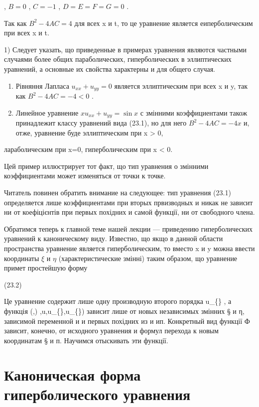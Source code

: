 \documentclass[
  ukrainian,
]{article}
\begin{document}
, \(B=0\) , \(C=-1\) , \(D=E=F=G=0\) .

Так как \(B^2 - 4AC = 4\) для всех x и t, то це уравнение является
еиперболическим при всех x и t.

1) Следует указать, що приведенные в примерах уравнения являются
частными случаями более общих параболических, гиперболических в
эллиптических уравнений, а основные их свойства характерны и для общего
случая.

\begin{enumerate}
\def\labelenumi{\arabic{enumi}.}
\setcounter{enumi}{2}
\item
  Рівняння Лапласа \(u_{xx} + u_{yy} = 0\) является эллиптическим при
  всех x и y, так как \(B^2 - 4AC = - 4 < 0\) .
\item
  Линейное уравнение \(xu_{xx} + u_{yy} = \sin x\) с змінними
  коэффициентами також принадлежит классу уравнений вида (23.1), но для
  него \(B^2-4AC=-4x\) и, отже, уравнение буде эллиптическим при x
  \textgreater{} 0,
\end{enumerate}

лараболическим при x=0, гиперболическим при x \textless{} 0.

Цей пример иллюстрирует тот факт, що тип уравнения о змінними
коэффициентами может изменяться от точки к точке.

Читатель повинен обратить внимание на следующее: тип уравнения (23.1)
определяется лише коэффициентами при вторых првизводных и никак не
зависит ни от коефіцієнтів при первых похідних и самой функції, ни от
свободного члена.

Обратимся теперь к главной теме нашей лекции --- приведению
гиперболических уравнений к каноническому виду. Известно, що якщо в
данной области пространства уравнение является гиперболическим, то
вместо x и y можна ввести координаты \(\xi\) и \(\eta\)
(характеристические змінні) таким образом, що уравнение примет
простейшую форму

(23.2)

Це уравнение содержит лише одну производную второго порядка
u\_\{\xi\eta\} , а функція \Phi(\xi,) \eta,u,u\_\{\xi\},u\_\{\eta\})
зависит лише от новых независимых змінних § и η, зависимой переменной и
и первых похідних из и ип. Конкретный вид функції Ф зависит, конечно, от
исходного уравнения и формул перехода к новым координатам § и п.
Научимся отыскивать эти функції.

\section{Каноническая форма гиперболического
уравнения}\label{ux43aux430ux43dux43eux43dux438ux447ux435ux441ux43aux430ux44f-ux444ux43eux440ux43cux430-ux433ux438ux43fux435ux440ux431ux43eux43bux438ux447ux435ux441ux43aux43eux433ux43e-ux443ux440ux430ux432ux43dux435ux43dux438ux44f}
\end{document}
